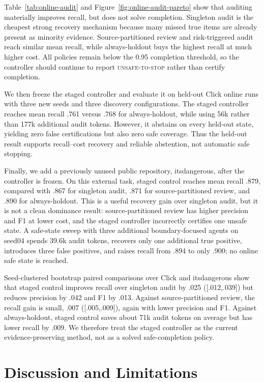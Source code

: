 \documentclass[letterpaper]{article}
\begin{document}
Table~\ref{tab:online-audit} and Figure~\ref{fig:online-audit-pareto} show that
auditing materially improves recall, but does not solve completion. Singleton
audit is the cheapest strong recovery mechanism because many missed true items
are already present as minority evidence. Source-partitioned review and
risk-triggered audit reach similar mean recall, while always-holdout buys the
highest recall at much higher cost. All policies remain below the 0.95
completion threshold, so the controller should continue to report
\textsc{unsafe-to-stop} rather than certify completion.

We then freeze the staged controller and evaluate it on held-out Click online
runs with three new seeds and three discovery configurations. The staged
controller reaches mean recall .761 versus .768 for always-holdout, while using
56k rather than 177k additional audit tokens. However, it abstains on every
held-out state, yielding zero false certifications but also zero safe coverage.
Thus the held-out result supports recall--cost recovery and reliable abstention,
not automatic safe stopping.

Finally, we add a previously unused public repository, itsdangerous, after the
controller is frozen. On this external task, staged control reaches mean recall
.879, compared with .867 for singleton audit, .871 for source-partitioned
review, and .890 for always-holdout. This is a useful recovery gain over
singleton audit, but it is not a clean dominance result: source-partitioned
review has higher precision and F1 at lower cost, and the staged controller
incorrectly certifies one unsafe state. A safe-state sweep with three additional
boundary-focused agents on seed04 spends 39.6k audit tokens, recovers only one
additional true positive, introduces three false positives, and raises recall
from .894 to only .900; no online safe state is reached.

Seed-clustered bootstrap paired comparisons over Click and itsdangerous show
that staged control improves recall over singleton audit by .025
([.012,.039]) but reduces precision by .042 and F1 by .013. Against
source-partitioned review, the recall gain is small, .007 ([.005,.009]), again
with lower precision and F1. Against always-holdout, staged control saves about
71k audit tokens on average but has lower recall by .009. We therefore treat
the staged controller as the current evidence-preserving method, not as a
solved safe-completion policy.

\section{Discussion and Limitations}
\end{document}
